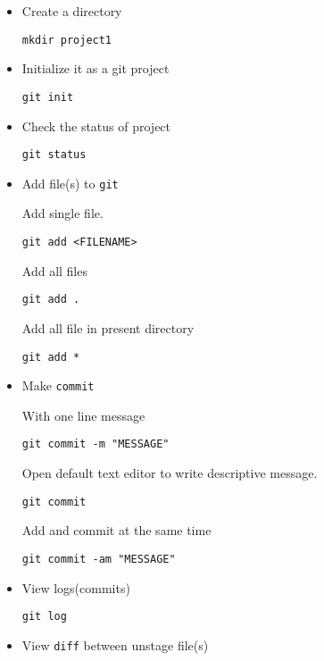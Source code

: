 \documentclass[11pt]{article}
\begin{document}
    
\begin{itemize}
\item Create a directory

\begin{verbatim}
mkdir project1
\end{verbatim}
\item Initialize it as a git project 

\begin{verbatim}
git init
\end{verbatim}
\item Check the status of project

\begin{verbatim}
git status
\end{verbatim}
\item Add file(s) to \texttt{git}

     Add single file.

\begin{verbatim}
git add <FILENAME>
\end{verbatim}
     
     Add all files

\begin{verbatim}
git add .
\end{verbatim}

     Add all file in present directory

\begin{verbatim}
git add *
\end{verbatim}
\item Make \texttt{commit}
     
     With one line message

\begin{verbatim}
git commit -m "MESSAGE"
\end{verbatim}

     Open default text editor to write descriptive message.

\begin{verbatim}
git commit
\end{verbatim}

     Add and commit at the same time

\begin{verbatim}
git commit -am "MESSAGE"
\end{verbatim}
\item View logs(commits)

\begin{verbatim}
git log
\end{verbatim}
\item View \texttt{diff} between unstage file(s)


\end{itemize}
\end{document}
